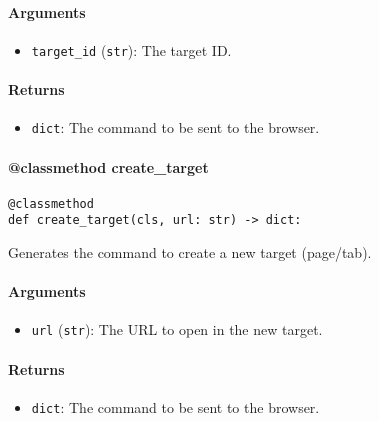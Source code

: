 \documentclass{article}
\begin{document}
\paragraph{Arguments}

\begin{itemize}
    \item \lstinline[style=pythonstyle]|target_id| (\lstinline[style=pythonstyle]|str|): The target ID.
\end{itemize}

\paragraph{Returns}

\begin{itemize}
    \item \lstinline[style=pythonstyle]|dict|: The command to be sent to the browser.
\end{itemize}

\paragraph{@classmethod create\_target}

\begin{lstlisting}[style=pythonstyle]
@classmethod
def create_target(cls, url: str) -> dict:
\end{lstlisting}

\noindent Generates the command to create a new target (page/tab).

\paragraph{Arguments}

\begin{itemize}
    \item \lstinline[style=pythonstyle]|url| (\lstinline[style=pythonstyle]|str|): The URL to open in the new target.
\end{itemize}

\paragraph{Returns}

\begin{itemize}
    \item \lstinline[style=pythonstyle]|dict|: The command to be sent to the browser.
\end{itemize}
\end{document}
